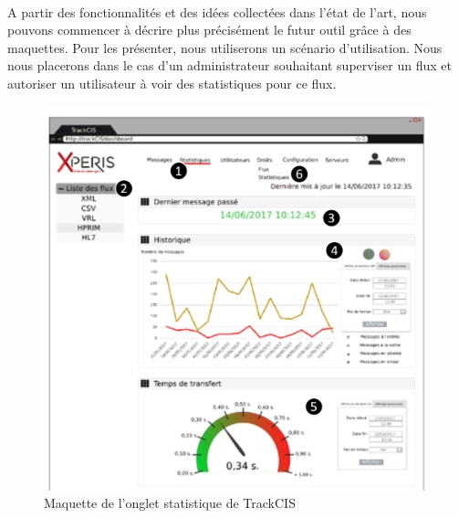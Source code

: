 			\paragraph{}
			A partir des fonctionnalités et des idées collectées dans l'état de l'art,
			nous pouvons commencer à décrire plus précisément le futur outil grâce à des
			maquettes. Pour les présenter, nous utiliserons un scénario d'utilisation.
			Nous nous placerons dans le cas d'un administrateur souhaitant superviser un
			flux et autoriser un utilisateur à voir des statistiques pour ce flux.
			\begin{figure}[H]
				\centering
				\includegraphics[width=16cm]{../img/part2/maquette_user_1.png}
				\caption{\label{maquette_user} Maquette de l'onglet statistique de
				TrackCIS}
			\end{figure}
			
